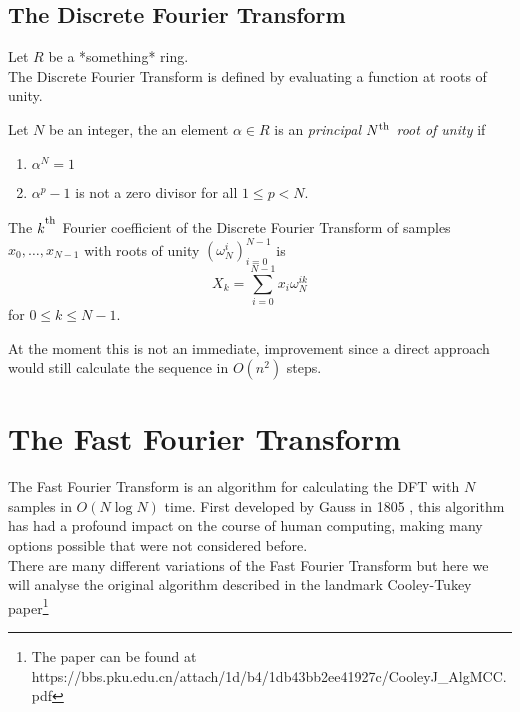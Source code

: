 \subsection{The Discrete Fourier Transform}

Let $R$ be a *something* ring.\\

The Discrete Fourier Transform is defined by evaluating a function at roots of unity.

\begin{definition}
  Let $N$ be an integer, the an element $\alpha \in R$ is an \emph{principal $N^{\textrm{th}}$ root of unity} if
  \begin{enumerate}
    \item $\alpha^N = 1$
    \item $\alpha^p - 1$ is not a zero divisor for all $1 \leq p < N$.
  \end{enumerate}
\end{definition}


\begin{definition}
The $k^{\textsuperscript{\textup{th}}}$ Fourier coefficient of the Discrete Fourier Transform of samples $x_0, \ldots, x_{N-1}$ with roots of unity $(\omega_N^i)_{i=0}^{N-1}$ is 
\[
    X_k = \sum^{N-1}_{i=0}x_i\omega_{N}^{ik}
\]
for $0 \leq k \leq N-1$.\\
\end{definition}

At the moment this is not an immediate, improvement since a direct approach would still calculate the sequence in $O(n^2)$ steps.


\section{The Fast Fourier Transform}

The Fast Fourier Transform is an algorithm for calculating the DFT with $N$ samples in $O(N \log N)$ time. First developed by Gauss in 1805 \cite{guass}, this algorithm has had a profound impact on the course of human computing, making many options possible that were not considered before.\\
There are many different variations of the Fast Fourier Transform but here we will analyse the original algorithm described in the landmark Cooley-Tukey paper\footnote{The paper can be found at https://bbs.pku.edu.cn/attach/1d/b4/1db43bb2ee41927c/CooleyJ\_AlgMCC.pdf}\\


